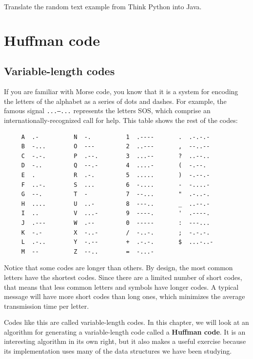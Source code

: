 \documentclass[12pt]{book}
\theoremstyle{exercise}
\begin{document}
Translate the random text example from Think Python into Java.


\chapter{Huffman code}
\label{huffman}

\section{Variable-length codes}

If you are familiar with Morse code, you know that it is a system
for encoding the letters of the alphabet as a series of dots and
dashes.  For example, the famous signal {\tt ...---...} represents
the letters SOS, which comprise an internationally-recognized call
for help.  This table shows the rest of the codes:

\begin{verbatim}
     A  .-          N  -.          1  .----       .  .-.-.-
     B  -...        O  ---         2  ..---       ,  --..--
     C  -.-.        P  .--.        3  ...--       ?  ..--..
     D  -..         Q  --.-        4  ....-       (  -.--.
     E  .           R  .-.         5  .....       )  -.--.-
     F  ..-.        S  ...         6  -....       -  -....-
     G  --.         T  -           7  --...       "  .-..-.
     H  ....        U  ..-         8  ---..       _  ..--.-
     I  ..          V  ...-        9  ----.       '  .----.
     J  .---        W  .--         0  -----       :  ---...
     K  -.-         X  -..-        /  -..-.       ;  -.-.-.
     L  .-..        Y  -.--        +  .-.-.       $  ...-..-
     M  --          Z  --..        =  -...-
\end{verbatim}


Notice that some codes are longer than others.  By design, the
most common letters have the shortest codes.  Since there are a
limited number of short codes, that means that less common
letters and symbols have longer codes.  A typical message will
have more short codes than long ones, which minimizes the average
transmission time per letter.


Codes like this are called variable-length codes.  In this chapter,
we will look at an algorithm for generating a variable-length code
called a {\bf Huffman code}.  It is an interesting algorithm in
its own right, but it also makes a useful exercise because its
implementation uses many of the data structures we have been studying.
\end{document}
